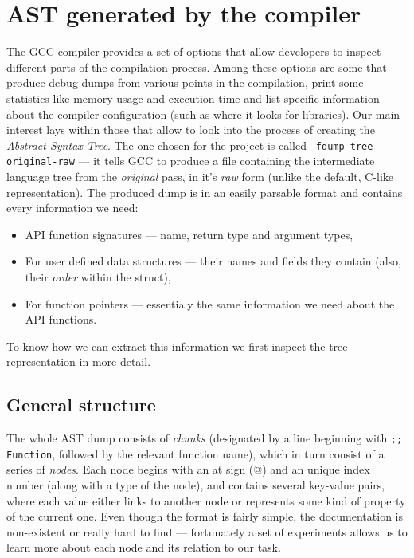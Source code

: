 \documentclass[polish, english]{iithesis}
\begin{document}
\chapter{AST generated by the compiler}
The GCC compiler provides a set of options that allow developers to inspect different parts of the compilation process.
Among these options are some that produce debug dumps from various points in the compilation, print some statistics like memory usage and execution time and list specific information about the compiler configuration (such as where it looks for libraries).
Our main interest lays within those that allow to look into the process of creating the \textit{Abstract Syntax Tree}.
The one chosen for the project is called \texttt{-fdump-tree-original-raw} --- it tells GCC to produce a file containing the intermediate language tree from the \textit{original} pass, in it's \textit{raw} form (unlike the default, C-like representation). 
The produced dump is in an easily parsable format and contains every information we need:
\begin{itemize}
  \item API function signatures --- name, return type and argument types,
  \item For user defined data structures --- their names and fields they contain (also, their \textit{order} within the struct),
  \item For function pointers --- essentialy the same information we need about the API functions.
\end{itemize}
To know how we can extract this information we first inspect the tree representation in more detail.
  \section{General structure}
The whole AST dump consists of \textit{chunks} (designated by a line beginning with \texttt{;; Function}, followed by the relevant function name), which in turn consist of a series of \textit{nodes}.
Each node begins with an at sign (@) and an unique index number (along with a type of the node), and contains several key-value pairs, where each value either links to another node or represents some kind of property of the current one.
Even though the format is fairly simple, the documentation is non-existent or really hard to find --- fortunately a set of experiments allows us to learn more about each node and its relation to our task. 
\end{document}
